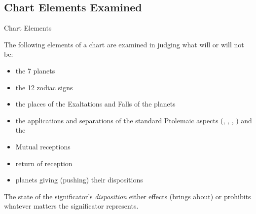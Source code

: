 \subsection{Chart Elements Examined}
\begin{frame}[t]{Chart Elements}

The following elements of a chart are examined in judging what will or will not be:
\begin{itemize}
\item the 7 planets
\item the 12 zodiac signs
\item the places of  the Exaltations and Falls of the planets
\item the applications and separations of the standard Ptolemaic aspects (\Sextile, \Square, \Trine, \Opposition) and the \Conjunction
\item Mutual receptions
\item return of reception
\item planets giving (pushing) their dispositions
\end{itemize}
\vspace{0.5cm}

The state of the significator's \textsl{disposition} either effects (brings about) or prohibits whatever matters the significator represents.
\end{frame}
